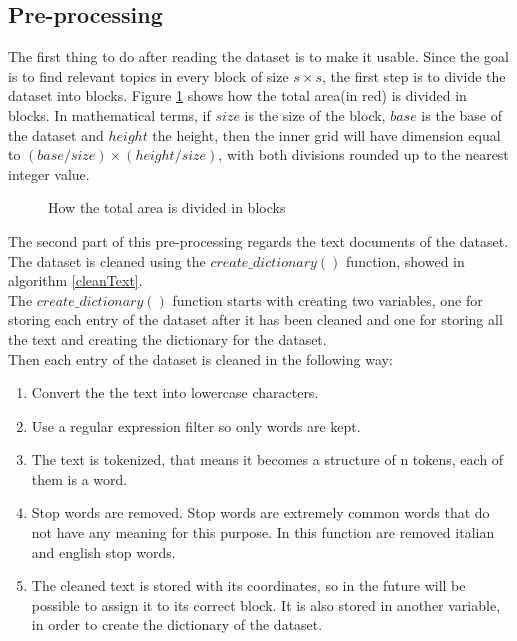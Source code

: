 \documentclass{sig-alternate-05-2015}
\begin{document}
\subsection{Pre-processing}
The first thing to do after reading the dataset is to make it usable. \newline
Since the goal is to find relevant topics in every block of size $s \times s$, the first step is to divide the dataset into blocks.
Figure \ref{blocks} shows how the total area(in red) is divided in blocks. In mathematical terms, if $size$ is the size of the block, $base$ is the base of the dataset and $height$ the height, then the inner grid will have dimension equal to $(base/size) \times (height/size)$, with both divisions rounded up to the nearest integer value.
\begin{figure}[h]
  \caption{How the total area is divided in blocks}
  \label{blocks}
\end{figure}
The second part of this pre-processing regards the text documents of the dataset.
The dataset is cleaned using the $create\_dictionary()$ function, showed in algorithm \ref{cleanText}.\\
The $create\_dictionary()$ function starts with creating two variables, one for storing each entry of the dataset after it has been cleaned and one for storing all the text and creating the dictionary for the dataset. \\
Then each entry of the dataset is cleaned in the following way:
\begin{enumerate}
\item Convert the the text into lowercase characters.
\item Use a regular expression filter so only words are kept.
\item The text is tokenized, that means it becomes a structure of n tokens, each of them is a word.
\item Stop words are removed. Stop words are extremely common words that do not have any meaning for this purpose. In this function are removed italian and english stop words.
\item The cleaned text is stored with its coordinates, so in the future will be possible to assign it to its correct block. It is also stored in another variable, in order to create the dictionary of the dataset.
\end{enumerate}
\end{document}
